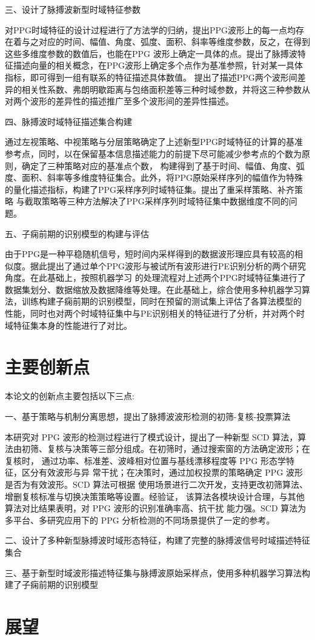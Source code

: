 三、设计了脉搏波新型时域特征参数

对PPG时域特征的设计过程进行了方法学的归纳，提出PPG波形上的每一点均存在着与之对应的时间、幅值、角度、弧度、面积、斜率等维度参数，反之，在得到这些多维度参数的数值后，也能在PPG
波形上确定一具体的点。提出了脉搏波特征描述向量的相关概念，在PPG波形上确定多个点作为基准参照，针对某一具体指标，即可得到一组有联系的特征描述具体数值。
提出了描述PPG两个波形间差异的相关性系数、弗朗明歇距离与包络面积差等三种时域参数，并将这三种参数从对两个波形的差异性的描述推广至多个波形间的差异性描述。

四、脉搏波时域特征描述集合构建

通过左视策略、中视策略与分层策略确定了上述新型PPG时域特征的计算的基准参考点，同时，以在保留基本信息描述能力的前提下尽可能减少参考点的个数为原则，确定了三种策略对应的基准点个数，
构建得到了基于时间、幅值、角度、弧度、面积、斜率等多维度特征集合。此外，将PPG原始采样序列的幅值作为特殊的量化描述指标，构建了PPG采样序列时域特征集。提出了重采样策略、补齐策略
与截取策略等三种方法解决了PPG采样序列时域特征集中数据维度不同的问题。

五、子痫前期的识别模型的构建与评估

由于PPG是一种平稳随机信号，短时间内采样得到的数据波形理应具有较高的相似度。据此提出了通过单个PPG波形与被试所有波形进行PE识别分析的两个研究角度。在此基础上，按照机器学习
的处理流程对上述两个PPG时域特征集进行了数据集划分、数据缩放及数据降维等处理。在此基础上，综合使用多种机器学习算法，训练构建子痫前期的识别模型，同时在预留的测试集上评估了各算法模型的
性能，同时也对两个时域特征集中与PE识别相关的特征进行了分析，并对两个时域特征集本身的性能进行了对比。

\section{主要创新点}
本论文的创新点主要包括以下三点:

一、基于策略与机制分离思想，提出了脉搏波波形检测的初筛-复核-投票算法

本研究对 PPG 波形的检测过程进行了模式设计，提出了一种新型 SCD 算法，算
法由初筛、复核与决策等三部分组成。在初筛时，通过搜索窗的方法确定波形；在复核时，
通过功率、标准差、波峰相对位置与基线漂移程度等 PPG 形态学特征，区分有效波形与异
常干扰；在决策时，通过加权投票的策略确定 PPG 波形是否为有效波形。SCD 算法可根据
使用场景进行二次开发，支持更改初筛算法、增删复核标准与切换决策策略等设置。经验证，
该算法各模块设计合理，与其他算法对比结果表明，对 PPG 波形的识别准确率高、抗干扰
能力强。SCD 算法为多平台、多研究应用下的 PPG 分析检测的不同场景提供了一定的参考。

二、设计了多种新型脉搏波时域形态特征，构建了完整的脉搏波信号时域描述特征集合



三、基于新型时域波形描述特征集与脉搏波原始采样点，使用多种机器学习算法构建了子痫前期的识别模型


\section{展望}

